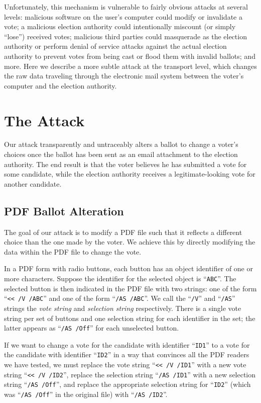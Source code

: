 \documentclass{article}
\begin{document}
Unfortunately, this mechanism is vulnerable to fairly obvious attacks
at several levels: malicious software on the user's computer could
modify or invalidate a vote; a malicious election authority could
intentionally miscount (or simply ``lose'') received votes; malicious
third parties could masquerade as the election authority or perform
denial of service attacks against the actual election authority to
prevent votes from being cast or flood them with invalid ballots; and
more. Here we describe a more subtle attack at the transport level,
which changes the raw data traveling through the electronic mail
system between the voter's computer and the election authority.

\section{The Attack}

Our attack transparently and untraceably alters a ballot to change a
voter's choices once the ballot has been sent as an email attachment
to the election authority. The end result is that the voter believes
he has submitted a vote for some candidate, while the election
authority receives a legitimate-looking vote for another candidate.

\subsection{PDF Ballot Alteration}

The goal of our attack is to modify a PDF file such that it reflects a
different choice than the one made by the voter. We achieve this by
directly modifying the data within the PDF file to change the
vote. 

In a PDF form with radio buttons, each button has an object identifier
of one or more characters. Suppose the identifier for the selected
object is ``\texttt{ABC}''. The selected button is then indicated in
the PDF file with two strings: one of the form ``\texttt{<{}< /V
  /ABC}'' and one of the form ``\texttt{/AS /ABC}''. We call the
``\texttt{/V}'' and ``\texttt{/AS}'' strings the \emph{vote string}
and \emph{selection string} respectively. There is a single vote
string per set of buttons and one selection string for each identifier
in the set; the latter appears as ``\texttt{/AS /Off}'' for each
unselected button.

If we want to change a vote for the candidate with identifier
``\texttt{ID1}'' to a vote for the candidate with identifier
``\texttt{ID2}'' in a way that convinces all the PDF readers we have
tested, we must replace the vote string ``\texttt{<{}< /V /ID1}'' with
a new vote string ``\texttt{<{}< /V /ID2}'', replace the selection
string ``\texttt{/AS /ID1}'' with a new selection string ``\texttt{/AS
  /Off}'', and replace the appropriate selection string for
``\texttt{ID2}'' (which was ``\texttt{/AS /Off}'' in the original
file) with ``\texttt{/AS /ID2}''.
\end{document}
